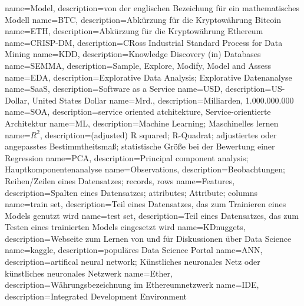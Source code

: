 {
    name=Model,
    description={von der englischen Bezeichung für ein mathematisches Modell}
}
{
    name=BTC,
    description={Abkürzung für die Kryptowährung Bitcoin}
}
{
    name=ETH,
    description={Abkürzung für die Kryptowährung Ethereum}
}
{
    name=CRISP-DM,
    description={CRoss Industrial Standard Process for Data Mining}
}
{
    name=KDD,
    description={Knowledge Discovery (in) Databases }
}
{
    name=SEMMA,
    description={Sample, Explore, Modify, Model and Assess}
}
{
    name=EDA,
    description={Explorative Data Analysis; Explorative Datenanalyse}
}
{
    name=SaaS,
    description={Software as a Service}
}
{
    name=USD,
    description={US-Dollar, United States Dollar}
}
{
    name=Mrd.,
    description={Milliarden, 1.000.000.000}
}
{
    name=SOA,
    description={service oriented atchitekture, Service-orientierte Architektur}
}
{
    name=ML,
    description={Machine Learning; Maschinelles lernen}
}
{
    name=$ R^2 $,
    description={(adjusted) R squared; R-Quadrat; adjustiertes oder angepasstes Bestimmtheitsmaß; statistische Größe bei der Bewertung einer Regression}
}
{
    name=PCA,
    description={Principal component analysis; Hauptkomponentenanalyse}
}
{
    name=Observations,
    description={Beobachtungen; Reihen/Zeilen eines Datensatzes; records, rows}
}
{
    name=Features,
    description={Spalten eines Datensatzes; attributes; Attribute; columns}
}
{
    name=train set,
    description={Teil eines Datensatzes, das zum Trainieren eines Models genutzt wird}
}
{
    name=test set,
    description={Teil eines Datensatzes, das zum Testen eines trainierten Models eingesetzt wird}
}
{
    name=KDnuggets,
    description={Webseite zum Lernen von und für Diskussionen über Data Science}
}
{
    name=kaggle,
    description={populäres Data Science Portal}
}
{
    name=ANN,
    description={artifical neural network; Künstliches neuronales Netz oder künstliches neuronales Netzwerk}
}
{
    name=Ether,
    description={Währungsbezeichnung im Ethereumnetzwerk}
}
{
    name=IDE,
    description={Integrated Development Environment}
}
